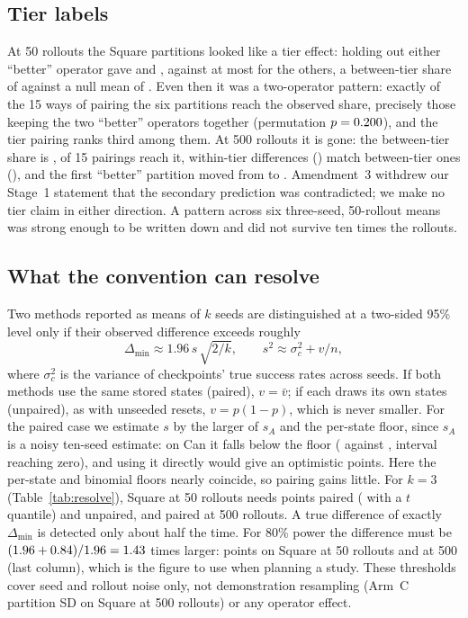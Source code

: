 \IfFileExists{IEEEtran.cls}{\documentclass[journal]{IEEEtran}}{\documentclass[10pt,twocolumn]{article}}
\begin{document}
\subsection{Tier labels}
\label{sec:tier}
At 50 rollouts the Square partitions looked like a tier effect: holding out either ``better'' operator gave \OneSqDropBOne{} and \OneSqDropBTwo, against at most \OneSqBMeanHi{} for the others, a between-tier share of \OneSqTierShare{} against a null mean of \OneSqTierNull. Even then it was a two-operator pattern: exactly \OneSqPairsReach{} of the 15 ways of pairing the six partitions reach the observed share, precisely those keeping the two ``better'' operators together (permutation $p=0.200$), and the tier pairing ranks third among them. At 500 rollouts it is gone: the between-tier share is \TwoSqTierShare, \TwoSqPairsReach{} of 15 pairings reach it, within-tier differences (\TwoSqTierWithin) match between-tier ones (\TwoSqTierBetween), and the first ``better'' partition moved from \OneSqDropBOne{} to \TwoSqDropBOne. Amendment~3 withdrew our Stage~1 statement that the secondary prediction was contradicted; we make no tier claim in either direction. A pattern across six three-seed, 50-rollout means was strong enough to be written down and did not survive ten times the rollouts.

\subsection{What the convention can resolve}
\label{sec:resolve}
Two methods reported as means of $k$ seeds are distinguished at a two-sided 95\% level only if their observed difference exceeds roughly
\begin{equation}
\Delta_{\min} \approx 1.96\, s\,\sqrt{2/k}, \qquad s^2 \approx \sigma_{c}^2 + v/n,
\label{eq:mdd}
\end{equation}
where $\sigma_c^2$ is the variance of checkpoints' true success rates across seeds. If both methods use the same stored states (paired), $v=\bar v$; if each draws its own states (unpaired), as with unseeded resets, $v=p(1-p)$, which is never smaller. For the paired case we estimate $s$ by the larger of $s_A$ and the per-state floor, since $s_A$ is a noisy ten-seed estimate: on Can it falls below the floor (\OneCanASD{} against \OneCanStateFloor, interval reaching zero), and using it directly would give an optimistic \OneCanMDDraw{} points. Here the per-state and binomial floors nearly coincide, so pairing gains little. For $k=3$ (Table~\ref{tab:resolve}), Square at 50 rollouts needs \OneSqMDD{} points paired (\OneSqMDDt{} with a $t$ quantile) and \OneSqMDDu{} unpaired, and \TwoSqMDD{} paired at 500 rollouts. A true difference of exactly $\Delta_{\min}$ is detected only about half the time. For 80\% power the difference must be $(1.96+0.84)/1.96=1.43$ times larger: \OneSqMDDpow{} points on Square at 50 rollouts and \TwoSqMDDpow{} at 500 (last column), which is the figure to use when planning a study. These thresholds cover seed and rollout noise only, not demonstration resampling (Arm~C partition SD \TwoSqCSDp{} on Square at 500 rollouts) or any operator effect.
\end{document}
